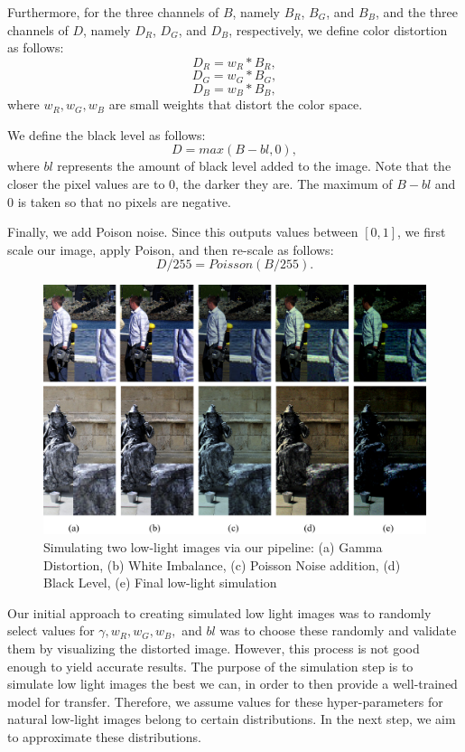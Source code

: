 \documentclass{article}
\begin{document}
Furthermore, for the three channels of \(B\), namely \(B_{R}\), \(B_{G}\), and \(B_{B}\), and the three channels of \(D\), namely \(D_{R}\), \(D_{G}\), and \(D_{B}\), respectively, we define color distortion as follows:
\[ D_{R} = w_{R}*B_{R},\]
\[ D_{G} = w_{G}*B_{G},\]
\[ D_{B} = w_{B}*B_{B},\]
where \(w_{R}, w_{G}, w_{B}\) are small weights that distort the color space.  

We define the black level as follows: 
\[  D = max(B-bl,0), \]
where \(bl\) represents the amount of black level added to the image. Note that the closer the pixel values are to 0, the darker they are. The maximum of \(B - bl\) and 0 is taken so that no pixels are negative. \newline

Finally, we add Poison noise. Since this outputs values between \([0, 1]\), we first scale our image, apply Poison, and then re-scale as follows:
\[  D/255 = Poisson(B/255). \]


\begin{figure}[ht]
  \centering
  \includegraphics[scale=0.3]{fig3.png}
  \caption{Simulating two low-light images via our pipeline: (a) Gamma Distortion, (b) White Imbalance, (c) Poisson Noise addition, (d) Black Level, (e) Final low-light simulation}
\end{figure}


Our initial approach to creating simulated low light images was to randomly select values for \(\gamma, w_{R}, w_{G}, w_{B},\) and \(bl\) was to choose these randomly and validate them by visualizing the distorted image. However, this process is not good enough to yield accurate results. The purpose of the simulation step is to simulate low light images the best we can, in order to then provide a well-trained model for transfer. Therefore, we assume values for these hyper-parameters for natural low-light images belong to certain distributions. In the next step, we aim to approximate these distributions.  \newline
\end{document}
